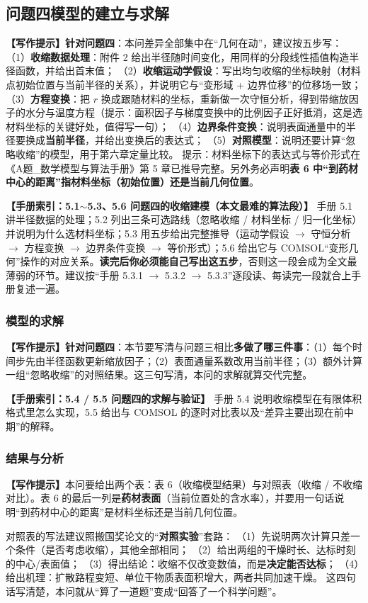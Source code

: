 \documentclass[12pt,a4paper]{article}
\newcommand{\prompt}[1]{\par\noindent\textbf{【写作提示】}#1\par}      %
\newcommand{\handbook}[2]{\par\noindent\textbf{【手册索引：#1】} #2\par}
\begin{document}
\subsection{问题四模型的建立与求解}

\prompt{\textbf{针对问题四}：本问差异全部集中在“几何在动”，建议按五步写：
（1）\textbf{收缩数据处理}：附件 2 给出半径随时间变化，用同样的分段线性插值构造半径函数，并给出首末值；
（2）\textbf{收缩运动学假设}：写出均匀收缩的坐标映射（材料点初始位置与当前半径的关系），并说明它与“变形域 + 边界位移”的位移场一致；
（3）\textbf{方程变换}：把 $r$ 换成跟随材料的坐标，重新做一次守恒分析，得到带缩放因子的水分与温度方程（提示：面积因子与梯度变换中的比例因子正好抵消，这是选材料坐标的关键好处，值得写一句）；
（4）\textbf{边界条件变换}：说明表面通量中的半径要换成\textbf{当前半径}，并给出变换后的表达式；
（5）\textbf{对照模型}：说明还要计算“忽略收缩”的模型，用于第六章定量比较。
提示：材料坐标下的表达式与等价形式在《A题\_数学模型与算法手册》第 5 章已推导完整。另外务必声明\textbf{表 6 中“到药材中心的距离”指材料坐标（初始位置）还是当前几何位置}。}

\handbook{5.1$\sim$5.3、5.6 问题四的收缩建模（本文最难的算法段）}{手册 5.1 讲半径数据的处理；5.2 列出三条可选路线（忽略收缩 / 材料坐标 / 归一化坐标）并说明为什么选材料坐标；5.3 用五步给出完整推导（运动学假设 $\rightarrow$ 守恒分析 $\rightarrow$ 方程变换 $\rightarrow$ 边界条件变换 $\rightarrow$ 等价形式）；5.6 给出它与 COMSOL“变形几何”操作的对应关系。\textbf{读完后你必须能自己写出这五步}，否则这一段会成为全文最薄弱的环节。建议按“手册 5.3.1 $\to$ 5.3.2 $\to$ 5.3.3”逐段读、每读完一段就合上手册复述一遍。}

\subsubsection{模型的求解}

\prompt{\textbf{针对问题四}：本节要写清与问题三相比\textbf{多做了哪三件事}：（1）每个时间步先由半径函数更新缩放因子；（2）表面通量系数改用当前半径；（3）额外计算一组“忽略收缩”的对照结果。这三句写清，本问的求解就算交代完整。}

\handbook{5.4 / 5.5 问题四的求解与验证}{手册 5.4 说明收缩模型在有限体积格式里怎么实现，5.5 给出与 COMSOL 的逐时对比表以及“差异主要出现在前中期”的解释。}

\subsubsection{结果与分析}

\prompt{本问要给出两个表：表 6（收缩模型结果）与对照表（收缩 / 不收缩对比）。表 6 的最后一列是\textbf{药材表面}（当前位置处的含水率），并要用一句话说明“到药材中心的距离”是材料坐标还是当前几何位置。

对照表的写法建议照搬国奖论文的“\textbf{对照实验}”套路：
（1）先说明两次计算只差一个条件（是否考虑收缩），其他全部相同；
（2）给出两组的干燥时长、达标时刻的中心/表面值；
（3）得出结论：收缩不仅改变数值，而是\textbf{决定能否达标}；
（4）给出机理：扩散路程变短、单位干物质表面积增大，两者共同加速干燥。
这四句话写清楚，本问就从“算了一道题”变成“回答了一个科学问题”。}
\end{document}
